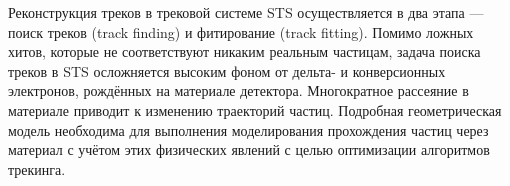

Реконструкция треков в трековой системе STS осуществляется в два этапа --- поиск треков (track finding) и фитирование (track fitting).
Помимо ложных хитов, которые не соответствуют никаким реальным частицам, задача поиска треков в STS осложняется высоким фоном от дельта- и конверсионных электронов, рождённых на материале детектора.
Многократное рассеяние в материале приводит к изменению траекторий частиц.
Подробная геометрическая модель необходима для выполнения моделирования прохождения частиц через материал с учётом этих физических явлений с целью оптимизации алгоритмов трекинга.

